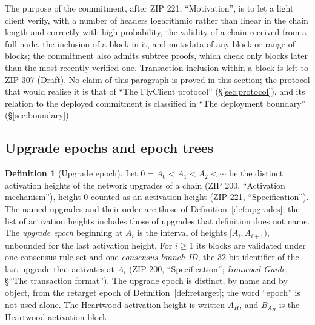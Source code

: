 \documentclass[11pt,a4paper]{article}
\theoremstyle{definition}
\newtheorem{definition}[theorem]{Definition}
\begin{document}
The purpose of the commitment, after ZIP 221, ``Motivation'', is to let a
light client verify, with a number of headers logarithmic rather than linear
in the chain length and correctly with high probability, the validity of a
chain received from a full node, the inclusion of a block in it, and metadata
of any block or range of blocks; the commitment also admits subtree proofs,
which check only blocks later than the most recently verified one.
Transaction inclusion within a block is left to ZIP 307 (Draft). No claim of
this paragraph is proved in this section; the protocol that would realise it
is that of ``The FlyClient protocol'' (\S\ref{sec:protocol}), and its
relation to the deployed commitment is classified in ``The deployment
boundary'' (\S\ref{sec:boundary}).

\subsection{Upgrade epochs and epoch trees}\label{sec:history-epochs}

\begin{definition}[Upgrade epoch]\label{def:upgrade-epoch}
Let $0 = A_0 < A_1 < A_2 < \cdots$ be the distinct activation heights of the
network upgrades of a chain (ZIP 200, ``Activation mechanism''), height $0$
counted as an activation height (ZIP 221, ``Specification''). The named
upgrades and their order are those of Definition~\ref{def:upgrades}; the list
of activation heights includes those of upgrades that definition does not
name. The \emph{upgrade epoch} beginning at $A_i$ is the interval of heights
$[A_i, A_{i+1})$, unbounded for the last activation height. For $i \ge 1$ its
blocks are validated under one consensus rule set and one \emph{consensus
branch ID}, the $32$-bit identifier of the last upgrade that activates at
$A_i$ (ZIP 200, ``Specification''; \emph{Ironwood Guide}, \S``The
transaction format''). The upgrade epoch is distinct, by name and by object,
from the retarget epoch of Definition~\ref{def:retarget}; the word ``epoch''
is not used alone. The Heartwood activation height is written $A_H$, and
$B_{A_H}$ is the Heartwood activation block.
\end{definition}
\end{document}
